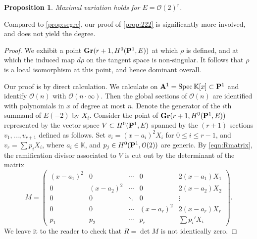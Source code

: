 \documentclass[11pt,reqno]{amsart}
\theoremstyle{plain}
\newtheorem{proposition}[theorem]{Proposition}
\theoremstyle{definition}
\theoremstyle{remark}
\numberwithin{equation}{section}
\renewcommand{\k}{\mathbb{K}}
\numberwithin{equation}{section}
\renewcommand{\O}{\mathcal O}
\begin{document}
\begin{proposition}\label{prop:222}
  Maximal variation holds for $E = \O(2)^r$.
\end{proposition}
Compared to \autoref{prop:segre}, our proof of \autoref{prop:222} is significantly more involved, and does not yield the degree.
\begin{proof}
  We exhibit a point $\Gr(r+1, H^0(\P^1, E))$ at which $\rho$ is defined, and at which the induced map $d\rho$ on the tangent space is non-singular.
  It follows that $\rho$ is a local isomorphism at this point, and hence dominant overall.

  Our proof is by direct calculation.
  We calculate on $\A^1 = \spec \k[x] \subset \P^1$ and identify $\O(n)$ with $\O(n \cdot \infty)$.
  Then the global sections of $\O(n)$ are identified with polynomials in $x$ of degree at most $n$.
  Denote the generator of the $i$th summand of $E(-2)$ by $X_i$.
  Consider the point of $\Gr(r+1, H^0(\P^1, E))$ represented by the vector space $V \subset H^0(\P^1, E)$ spanned by the $(r+1)$ sections $v_1, \dots, v_{r+1}$ defined as follows.
  Set $v_i = (x-a_i)^2 X_i$ for $0 \leq i \leq r-1$, and $v_r = \sum p_i X_i$, where $a_i \in \k$, and $p_j \in H^0(\P^1, \O(2))$ are generic.
  By \eqref{eqn:Rmatrix}, the ramification divisor associated to $V$ is cut out by the determinant of the matrix
  \[
    M =
    \begin{pmatrix}
      (x-a_1)^2 & 0 &  \cdots & 0 & 2(x-a_1)X_1\\
      0 & (x-a_2)^2 & \cdots & 0 & 2(x-a_2)X_2\\
      0 & 0 & \ddots & 0 & \vdots\\
      0 & 0 & \cdots & (x-a_r)^2& 2(x-a_r)X_r\\
      p_1 & p_2 & \cdots & p_r & \sum p_i' X_i
    \end{pmatrix}.
  \]
  We leave it to the reader to check that $R = \det M$ is not identically zero.


\end{proof}
\end{document}
